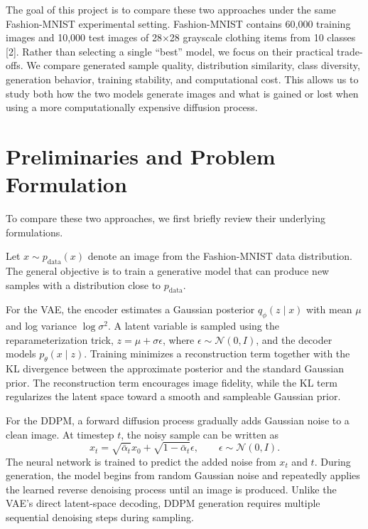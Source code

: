\documentclass{article}
\begin{document}
The goal of this project is to compare these two approaches under the same Fashion-MNIST experimental setting. Fashion-MNIST contains 60,000 training images and 10,000 test images of 28$\times$28 grayscale clothing items from 10 classes [2]. Rather than selecting a single ``best'' model, we focus on their practical trade-offs. We compare generated sample quality, distribution similarity, class diversity, generation behavior, training stability, and computational cost. This allows us to study both how the two models generate images and what is gained or lost when using a more computationally expensive diffusion process.

\section{Preliminaries and Problem Formulation}
To compare these two approaches, we first briefly review their underlying formulations.

Let $x \sim p_{\mathrm{data}}(x)$ denote an image from the Fashion-MNIST data distribution. The general objective is to train a generative model that can produce new samples with a distribution close to $p_{\mathrm{data}}$. 

For the VAE, the encoder estimates a Gaussian posterior $q_\phi(z\mid x)$ with mean $\mu$ and log variance $\log\sigma^2$. A latent variable is sampled using the reparameterization trick, $z=\mu+\sigma\epsilon$, where $\epsilon\sim\mathcal{N}(0,I)$, and the decoder models $p_\theta(x\mid z)$. Training minimizes a reconstruction term together with the KL divergence between the approximate posterior and the standard Gaussian prior. The reconstruction term encourages image fidelity, while the KL term regularizes the latent space toward a smooth and sampleable Gaussian prior.

For the DDPM, a forward diffusion process gradually adds Gaussian noise to a clean image. At timestep $t$, the noisy sample can be written as
\begin{equation}
 x_t=\sqrt{\bar{\alpha}_t}x_0+\sqrt{1-\bar{\alpha}_t}\epsilon,
 \qquad \epsilon\sim\mathcal{N}(0,I).
\end{equation}
The neural network is trained to predict the added noise from $x_t$ and $t$. During generation, the model begins from random Gaussian noise and repeatedly applies the learned reverse denoising process until an image is produced. Unlike the VAE’s direct latent-space decoding, DDPM generation requires multiple sequential denoising steps during sampling.
\end{document}

